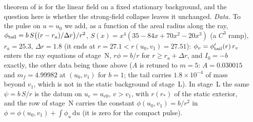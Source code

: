 \documentclass[11pt]{article}
\begin{document}
theorem of \citet{AngelopoulosAretakisGajic2018} is for the linear field on a fixed stationary background, and the question here is whether the strong-field collapse leaves it unchanged. \emph{Data.} To the pulse on $u=u_0$ we add, as a function of the areal radius along the ray, $\phi_{\rm tail}=b\,S\bigl((r-r_a)/\Delta r\bigr)/r^{2}$, $S(x)=x^{4}(35-84x+70x^{2}-20x^{3})$ (a $C^{3}$ ramp), $r_a=25.3$, $\Delta r=1.8$ (it ends at $r=27.1<r(u_0,v_1)=27.51$): $\phi_v=\phi_{\rm tail}'(r)\,r_v$ enters the ray equations of stage~N, $r\phi=b/r$ for $r\ge r_a+\Delta r$, and $I_0=-b$ exactly, the other data being those above ($A$ is retuned to $m=5$: $A=0.030015$ and $m_f=4.99982$ at $(u_0,v_1)$ for $b=1$; the tail carries $1.8\times10^{-4}$ of mass beyond $v_1$, which is not in the static background of stage~L). In stage~L the same $\psi=b\,S/r$ is the datum on $u_e=u_{e0}$, $v>v_1$, with $r(r_*)$ of the static exterior, and the row of stage~N carries the constant $\phi(u_0,v_1)=b/r^{2}$ in $\phi=\phi(u_0,v_1)+\int\phi_u\,\mathrm du$ (it is zero for the compact pulse).
\end{document}

